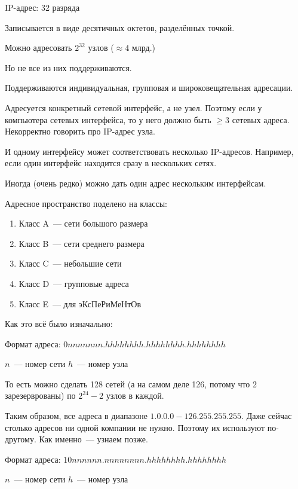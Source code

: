 
IP-адрес: 32 разряда

Записывается в виде десятичных октетов, разделённых точкой.

Можно адресовать $2^{32}$ узлов ($\approx 4\text{ млрд.}$)

Но не все из них поддерживаются.

Поддерживаются индивидуальная, групповая и широковещательная адресации.

Адресуется конкретный сетевой интерфейс, а не узел. Поэтому если у компьютера  сетевых интерфейса, то у него должно быть $\ge 3$ сетевых адреса. Некорректно говорить про IP-адрес узла.

И одному интерфейсу может соответствовать несколько IP-адресов. Например, если один интерфейс находится сразу в нескольких сетях.

Иногда (очень редко) можно дать один адрес нескольким интерфейсам.

Адресное пространство поделено на классы:

\begin{enumerate}
    \item Класс A~--- сети большого размера
    \item Класс B~--- сети среднего размера
    \item Класс C~--- небольшие сети
    \item Класс D~--- групповые адреса
    \item Класс E~--- для эКсПеРиМеНтОв
\end{enumerate}

Как это всё было изначально:


Формат адреса: $0nnnnnnn.hhhhhhhh.hhhhhhhh.hhhhhhhh$

$n$~--- номер сети
$h$~--- номер узла

То есть можно сделать 128 сетей (а на самом деле 126, потому что 2 зарезерврованы) по $2^{24}-2$ узлов в каждой.

Таким образом, все адреса в диапазоне $1.0.0.0-126.255.255.255$. Даже сейчас столько адресов ни одной компании не нужно. Поэтому их используют по-другому. Как именно~--- узнаем позже.


Формат адреса: $10nnnnnn.nnnnnnnn.hhhhhhhh.hhhhhhhh$

$n$~--- номер сети
$h$~--- номер узла

